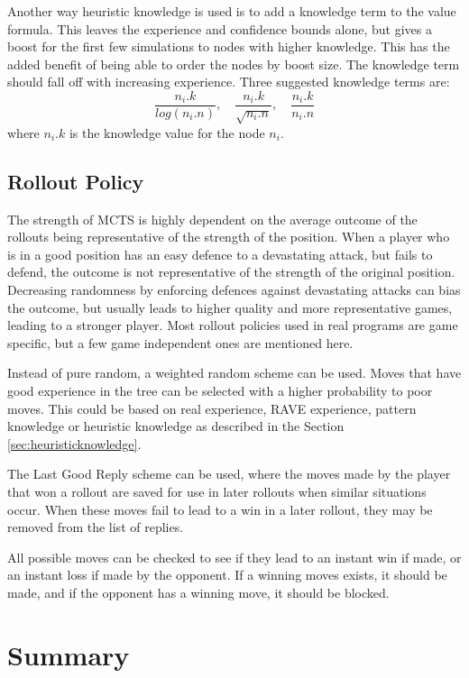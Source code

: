 Another way heuristic knowledge is used is to add a knowledge term to the value formula. This leaves the experience and confidence bounds alone, but gives a boost for the first few simulations to nodes with higher knowledge. This has the added benefit of being able to order the nodes by boost size. The knowledge term should fall off with increasing experience. Three suggested knowledge terms are: $$\frac{n_i.k}{log(n_i.n)}, \quad \frac{n_i.k}{\sqrt{n_i.n}}, \quad \frac{n_i.k}{n_i.n}$$ where $n_i.k$ is the knowledge value for the node $n_i$.


\subsection{Rollout Policy}

The strength of MCTS is highly dependent on the average outcome of the rollouts being representative of the strength of the position. When a player who is in a good position has an easy defence to a devastating attack, but fails to defend, the outcome is not representative of the strength of the original position. Decreasing randomness by enforcing defences against devastating attacks can bias the outcome, but usually leads to higher quality and more representative games, leading to a stronger player. Most rollout policies used in real programs are game specific, but a few game independent ones are mentioned here.

Instead of pure random, a weighted random scheme can be used. Moves that have good experience in the tree can be selected with a higher probability to poor moves. This could be based on real experience, RAVE experience, pattern knowledge or heuristic knowledge as described in the Section \ref{sec:heuristicknowledge}.

The Last Good Reply \cite{drake2009lgr, baier2010lgrf} scheme can be used, where the moves made by the player that won a rollout are saved for use in later rollouts when similar situations occur. When these moves fail to lead to a win in a later rollout, they may be removed from the list of replies.

All possible moves can be checked to see if they lead to an instant win if made, or an instant loss if made by the opponent. If a winning moves exists, it should be made, and if the opponent has a winning move, it should be blocked.


\section{Summary}


